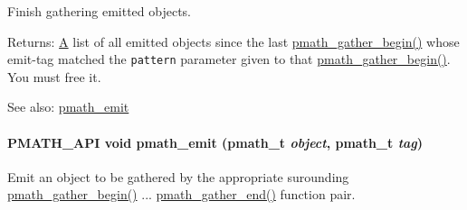 Finish gathering emitted objects. 

\begin{Desc}
\item[Returns:]\hyperlink{class_a}{A} list of all emitted objects since the last \hyperlink{group__helpers_g077f3730ca4275b87d9a35bce6013e45}{pmath\_\-gather\_\-begin()} whose emit-tag matched the {\tt pattern} parameter given to that \hyperlink{group__helpers_g077f3730ca4275b87d9a35bce6013e45}{pmath\_\-gather\_\-begin()}. You must free it.\end{Desc}
\begin{Desc}
\item[See also:]\hyperlink{group__helpers_ga06135012f4d2a0faf696c0cd1111075}{pmath\_\-emit} \end{Desc}
\hypertarget{group__helpers_ga06135012f4d2a0faf696c0cd1111075}{
\paragraph[{pmath\_\-emit}]{\setlength{\rightskip}{0pt plus 5cm}PMATH\_\-API void pmath\_\-emit ({\bf pmath\_\-t} {\em object}, \/  {\bf pmath\_\-t} {\em tag})}\hfill}
\label{group__helpers_ga06135012f4d2a0faf696c0cd1111075}


Emit an object to be gathered by the appropriate surounding \hyperlink{group__helpers_g077f3730ca4275b87d9a35bce6013e45}{pmath\_\-gather\_\-begin()} ... \hyperlink{group__helpers_ga2f732b35703986263e3a15592b4a46e}{pmath\_\-gather\_\-end()} function pair. 

